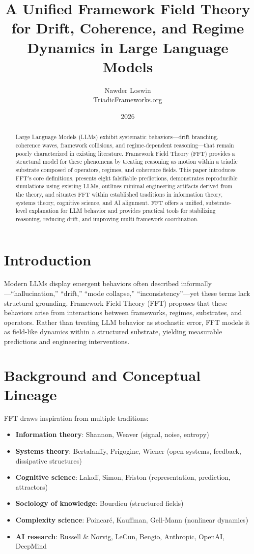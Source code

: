 \documentclass[11pt]{article}
\title{\textbf{A Unified Framework Field Theory for Drift, Coherence, and Regime Dynamics in Large Language Models}}
\author{Nawder Loswin \\ TriadicFrameworks.org}
\date{2026}
\begin{document}
\maketitle

\begin{abstract}
Large Language Models (LLMs) exhibit systematic behaviors---drift branching, coherence waves, framework collisions, and regime-dependent reasoning---that remain poorly characterized in existing literature. Framework Field Theory (FFT) provides a structural model for these phenomena by treating reasoning as motion within a triadic substrate composed of operators, regimes, and coherence fields. This paper introduces FFT's core definitions, presents eight falsifiable predictions, demonstrates reproducible simulations using existing LLMs, outlines minimal engineering artifacts derived from the theory, and situates FFT within established traditions in information theory, systems theory, cognitive science, and AI alignment. FFT offers a unified, substrate-level explanation for LLM behavior and provides practical tools for stabilizing reasoning, reducing drift, and improving multi-framework coordination.
\end{abstract}

\section{Introduction}

Modern LLMs display emergent behaviors often described informally---``hallucination,'' ``drift,'' ``mode collapse,'' ``inconsistency''---yet these terms lack structural grounding. Framework Field Theory (FFT) proposes that these behaviors arise from interactions between frameworks, regimes, substrates, and operators. Rather than treating LLM behavior as stochastic error, FFT models it as field-like dynamics within a structured substrate, yielding measurable predictions and engineering interventions.

\section{Background and Conceptual Lineage}

FFT draws inspiration from multiple traditions:

\begin{itemize}
    \item \textbf{Information theory}: Shannon, Weaver (signal, noise, entropy)
    \item \textbf{Systems theory}: Bertalanffy, Prigogine, Wiener (open systems, feedback, dissipative structures)
    \item \textbf{Cognitive science}: Lakoff, Simon, Friston (representation, prediction, attractors)
    \item \textbf{Sociology of knowledge}: Bourdieu (structured fields)
    \item \textbf{Complexity science}: Poincar\'e, Kauffman, Gell-Mann (nonlinear dynamics)
    \item \textbf{AI research}: Russell \& Norvig, LeCun, Bengio, Anthropic, OpenAI, DeepMind
\end{itemize}
\end{document}
